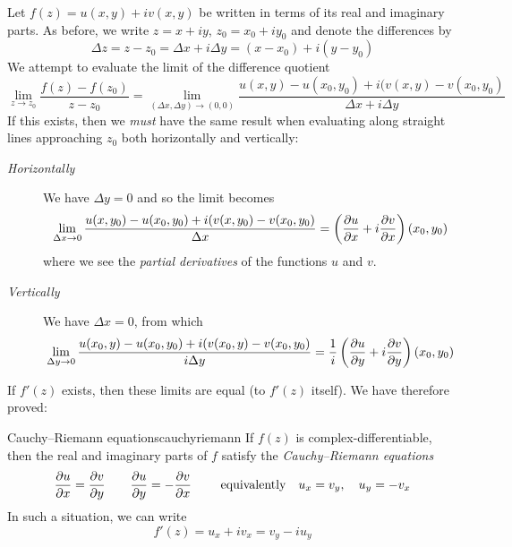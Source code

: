 Let $f(z)=u(x,y)+iv(x,y)$ be written in terms of its real and imaginary parts. As before, we write $z=x+iy$, $z_0=x_0+iy_0$ and denote the differences by
\[\Delta z=z-z_0=\Delta x+i\Delta y =(x-x_0)+i(y-y_0)\]
We attempt to evaluate the limit of the difference quotient
\[\lim\limits_{z\to z_0}\frac{f(z)-f(z_0)}{z-z_0}= \lim\limits_{(\Delta x,\Delta y)\to (0,0)}\frac{u(x,y)-u(x_0,y_0)+i(v(x,y)-v(x_0,y_0)}{\Delta x+i\Delta y}\]
If this exists, then we \emph{must} have the same result when evaluating along straight lines  approaching $z_0$ both horizontally and vertically:
\begin{description}
\item[\normalfont\emph{Horizontally}]\quad We have $\Delta y=0$ and so the limit becomes
\[\lim_{\Delta x\to 0}\frac{u(x,y_0)-u(x_0,y_0)+i(v(x,y_0)-v(x_0,y_0)}{\Delta x} =\left(\partials[u]{x}+i\partials[v]{x}\right)(x_0,y_0)\]
where we see the \emph{partial derivatives} of the functions $u$ and $v$.
\item[\normalfont\emph{Vertically}]\quad We have $\Delta x=0$, from which
\[\lim_{\Delta y\to 0}\frac{u(x_0,y)-u(x_0,y_0)+i(v(x_0,y)-v(x_0,y_0)}{i\Delta y} =\frac 1i\left(\partials[u]{y}+i\partials[v]{y}\right)(x_0,y_0)\]
\end{description}
If $f'(z)$ exists, then these limits are equal (to $f'(z)$ itself). We have therefore proved:

\begin{thm}{Cauchy--Riemann equations}{cauchyriemann}
If $f(z)$ is complex-differentiable, then the real and imaginary parts of $f$ satisfy the \emph{Cauchy--Riemann equations}
\[\partials[u]{x}=\partials[v]{y}\qquad \partials[u]{y}=-\partials[v]{x} \qquad\text{ equivalently}\quad u_x=v_y,\quad u_y=-v_x\]
In such a situation, we can write
\[f'(z)=u_x+iv_x =v_y-iu_y\]
\end{thm}

